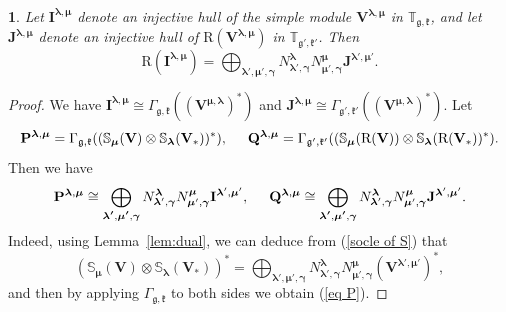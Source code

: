 \documentclass[12pt,oneside,english]{amsart}
\numberwithin{equation}{section}
\numberwithin{figure}{section}
\theoremstyle{plain}
\theoremstyle{plain}
\newtheorem{lem}[thm]{\protect\lemmaname}
\theoremstyle{remark}
\theoremstyle{definition}
\theoremstyle{plain}
\theoremstyle{remark}
\theoremstyle{definition}
\theoremstyle{plain}
\theoremstyle{plain}
\theoremstyle{definition}
\providecommand{\lemmaname}{Lemma}
\newcommand{\bP}{\mathbf{P}}
\newcommand{\bV}{\mathbf{V}}
\newcommand{\bJ}{\mathbf{J}}
\newcommand{\bI}{\mathbf{I}}
\newcommand{\bQ}{\mathbf{Q}}
\newcommand{\fg}{\mathfrak{g}}
\newcommand{\fk}{\mathfrak{k}}
\begin{document}
\begin{lem}\label{cor:Roninjectives} Let $\bI^{\boldsymbol{\lambda},{\boldsymbol{\mu}}}$ denote an injective hull of the simple module $\bV^{\boldsymbol{\lambda},{\boldsymbol{\mu}}}$ in $\mathbb T_{\fg,\fk}$,  and let $\bJ^{\boldsymbol{\lambda},{\boldsymbol{\mu}}}$ denote an injective hull of $\mathrm{R}(\bV^{\boldsymbol{\lambda},{\boldsymbol{\mu}}})$ in $\mathbb T_{\fg',\fk'}$. Then
  $$\mathrm{R}(\bI^{\boldsymbol{\lambda},{\boldsymbol{\mu}}})=\bigoplus_{\boldsymbol{\lambda'},\boldsymbol{\mu'},{\boldsymbol{\gamma}}} N^{\boldsymbol{\lambda}}_{\boldsymbol{\lambda}',{\boldsymbol{\gamma}}}N^{{\boldsymbol{\mu}}}_{{\boldsymbol{\mu}}',{\boldsymbol{\gamma}}}\bJ^{\boldsymbol{\lambda}',{\boldsymbol{\mu}}'}.$$
  \end{lem}

\begin{proof}  We have  $\bI^{\boldsymbol{\lambda},{\boldsymbol{\mu}}}\cong\Gamma_{\fg,\fk}((\bV^{{\boldsymbol{\mu}},\boldsymbol{\lambda}})^*)$ and $\bJ^{\boldsymbol{\lambda},{\boldsymbol{\mu}}}\cong\Gamma_{\fg',\fk'}((\bV^{{\boldsymbol{\mu}},\boldsymbol{\lambda}})^*)$.
Let $$\bP^{\boldsymbol{\lambda},{\boldsymbol{\mu}}}=\Gamma_{\fg,\fk}((\mathbb{S}_{\boldsymbol{\mu}}(\bV)\otimes \mathbb{S}_{\boldsymbol{\lambda}}(\bV_*))^*),\hspace{.5cm} \bQ^{\boldsymbol{\lambda},{\boldsymbol{\mu}}}=\Gamma_{\fg',\fk'}((\mathbb{S}_{\boldsymbol{\mu}}(\mathrm{R}(\bV))\otimes \mathbb{S}_{\boldsymbol{\lambda}}(\mathrm{R}(\bV_*))^*).$$ Then we have
\begin{equation}\label{eq P}
\bP^{\boldsymbol{\lambda},{\boldsymbol{\mu}}}\cong\bigoplus_{\boldsymbol{\lambda'},\boldsymbol{\mu'},{\boldsymbol{\gamma}}} N_{\boldsymbol{\lambda}',{\boldsymbol{\gamma}}}^{\boldsymbol{\lambda}} N_{{\boldsymbol{\mu}}',{\boldsymbol{\gamma}}}^{{\boldsymbol{\mu}}} \bI^{\boldsymbol{\lambda}',{\boldsymbol{\mu}}'}, \hspace{.5cm}
\bQ^{\boldsymbol{\lambda},{\boldsymbol{\mu}}}\cong\bigoplus_{\boldsymbol{\lambda'},\boldsymbol{\mu'},{\boldsymbol{\gamma}}} N_{\boldsymbol{\lambda}',{\boldsymbol{\gamma}}}^{\boldsymbol{\lambda}} N_{{\boldsymbol{\mu}}',{\boldsymbol{\gamma}}}^{{\boldsymbol{\mu}}} \bJ^{\boldsymbol{\lambda}',{\boldsymbol{\mu}}'}.
\end{equation}
Indeed, using Lemma~\ref{lem:dual}, we can deduce from (\ref{socle of S})  that
$$
(\mathbb{S}_{\boldsymbol{\mu}}(\bV)\otimes \mathbb{S}_{\boldsymbol{\lambda}}(\bV_*))^*=\bigoplus_{\boldsymbol{\lambda'},\boldsymbol{\mu'},{\boldsymbol{\gamma}}} N_{\boldsymbol{\lambda}',{\boldsymbol{\gamma}}}^{\boldsymbol{\lambda}} N_{{\boldsymbol{\mu}}',{\boldsymbol{\gamma}}}^{{\boldsymbol{\mu}}}(\bV^{\boldsymbol{\lambda}',{\boldsymbol{\mu}}'})^*,
$$
and then by applying $\Gamma_{\fg,\fk}$ to both sides we obtain (\ref{eq P}).


\end{proof}
\end{document}
